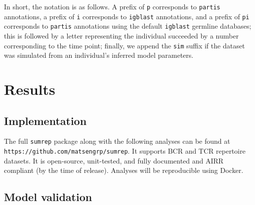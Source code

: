 \documentclass{article}
\begin{document}
In short, the notation is as follows.
A prefix of \texttt{p} corresponds to \texttt{partis} annotations, a prefix of \texttt{i} corresponds to \texttt{igblast} annotations, and a prefix of \texttt{pi} corresponds to \texttt{partis} annotations using the default \texttt{igblast} germline databases;
this is followed by a letter representing the individual succeeded by a number corresponding to the time point;
finally, we append the \texttt{sim} suffix if the dataset was simulated from an individual's inferred model parameters.

\section*{Results}

\subsection*{Implementation}
The full \texttt{sumrep} package along with the following analyses can be found at \texttt{https://github.com/matsengrp/sumrep}.
It supports BCR and TCR repertoire datasets.
It is open-source, unit-tested, and fully documented and AIRR compliant (by the time of release).
Analyses will be reproducible using Docker.

\subsection*{Model validation}
\end{document}
